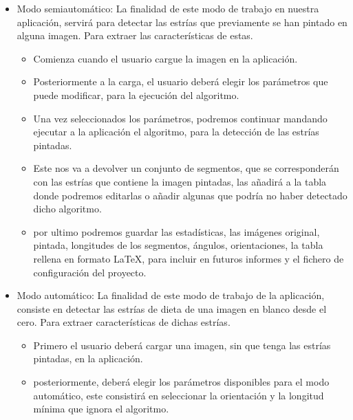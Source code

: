 \begin{itemize}
	\item Modo semiautomático:
La finalidad de este modo de trabajo en nuestra aplicación, servirá para detectar las estrías que previamente se han pintado en alguna imagen. Para extraer las características de estas.
	\begin{itemize}
		\item Comienza cuando el usuario cargue la imagen en la aplicación.
		\item Posteriormente a la carga, el usuario deberá elegir los parámetros que puede modificar, para la ejecución del algoritmo.
		\item Una vez seleccionados los parámetros, podremos continuar mandando ejecutar a la aplicación el algoritmo, para la detección de las estrías pintadas.
		\item Este nos va a devolver un conjunto de segmentos, que se corresponderán con las estrías que contiene la imagen pintadas, las añadirá a la tabla donde podremos editarlas o añadir algunas que podría no haber detectado dicho algoritmo.
		\item por ultimo podremos guardar las estadísticas, las imágenes original, pintada, longitudes de los segmentos, ángulos, orientaciones, la tabla rellena en formato \LaTeX , para incluir en futuros informes y el fichero de configuración del proyecto.
	\end{itemize}
	\item Modo automático:
	La finalidad de este modo de trabajo de la aplicación, consiste en detectar las estrías de dieta de una imagen en blanco desde el cero. Para extraer características de dichas estrías.
	\begin{itemize}
		\item Primero el usuario deberá cargar una imagen, sin que tenga las estrías pintadas, en la aplicación.
		\item posteriormente, deberá elegir los parámetros disponibles para el modo automático, este consistirá en seleccionar la orientación y la longitud mínima que ignora el algoritmo.
		

\end{itemize}
\end{itemize}
